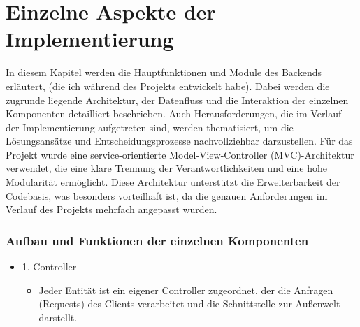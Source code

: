 \chapter{Einzelne Aspekte der Implementierung}
In diesem Kapitel werden die Hauptfunktionen und Module des Backends erläutert, (die ich während des Projekts entwickelt habe). Dabei werden die zugrunde liegende Architektur, der Datenfluss und die Interaktion der einzelnen Komponenten detailliert beschrieben. Auch Herausforderungen, die im Verlauf der Implementierung aufgetreten sind, werden thematisiert, um die Lösungsansätze und Entscheidungsprozesse nachvollziehbar darzustellen.
\newline
Für das Projekt wurde eine service-orientierte Model-View-Controller (MVC)-Architektur verwendet, die eine klare Trennung der Verantwortlichkeiten und eine hohe Modularität ermöglicht. Diese Architektur unterstützt die Erweiterbarkeit der Codebasis, was besonders vorteilhaft ist, da die genauen Anforderungen im Verlauf des Projekts mehrfach angepasst wurden.
\newline
\subsection*{Aufbau und Funktionen der einzelnen Komponenten}
\begin{itemize}
\item 1. Controller
\begin{itemize}
    \item Jeder Entität ist ein eigener Controller zugeordnet, der die Anfragen (Requests) des Clients verarbeitet und die Schnittstelle zur Außenwelt darstellt.
    \end{itemize}
\end{itemize}
\label{chap:kapitel6}